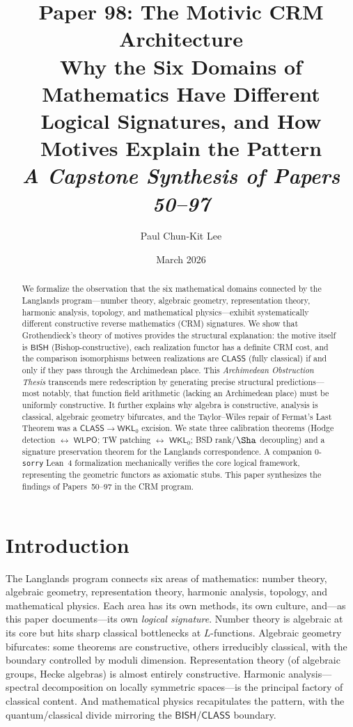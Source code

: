 \documentclass[11pt,a4paper]{article}
\title{\textbf{Paper 98: The Motivic CRM Architecture}\\[6pt]
\large Why the Six Domains of Mathematics Have Different\\
Logical Signatures, and How Motives Explain the Pattern\\[12pt]
\normalsize\textit{A Capstone Synthesis of Papers 50--97}}
\author{Paul Chun-Kit Lee}
\date{March 2026}
\theoremstyle{plain}
\theoremstyle{definition}
\newcommand{\BISH}{\textsf{BISH}}
\newcommand{\WKL}{\textsf{WKL}_0}
\newcommand{\WLPO}{\textsf{WLPO}}
\newcommand{\CLASS}{\textsf{CLASS}}
\begin{document}
\maketitle

\begin{abstract}
We formalize the observation that the six mathematical domains connected by the Langlands program---number theory, algebraic geometry, representation theory, harmonic analysis, topology, and mathematical physics---exhibit systematically different constructive reverse mathematics (CRM) signatures. We show that Grothendieck's theory of motives provides the structural explanation: the motive itself is $\BISH$ (Bishop-constructive), each realization functor has a definite CRM cost, and the comparison isomorphisms between realizations are $\CLASS$ (fully classical) if and only if they pass through the Archimedean place. This \emph{Archimedean Obstruction Thesis} transcends mere redescription by generating precise structural predictions---most notably, that function field arithmetic (lacking an Archimedean place) must be uniformly constructive. It further explains why algebra is constructive, analysis is classical, algebraic geometry bifurcates, and the Taylor--Wiles repair of Fermat's Last Theorem was a $\CLASS \to \WKL$ excision. We state three calibration theorems (Hodge detection $\leftrightarrow$ $\WLPO$; TW patching $\leftrightarrow$ $\WKL$; BSD rank/$\Sha$ decoupling) and a signature preservation theorem for the Langlands correspondence. A companion 0-\texttt{sorry} Lean~4 formalization mechanically verifies the core logical framework, representing the geometric functors as axiomatic stubs. This paper synthesizes the findings of Papers~50--97 in the CRM program.
\end{abstract}

\tableofcontents
\newpage

\section{Introduction}\label{sec:intro}

The Langlands program connects six areas of mathematics: number theory, algebraic geometry, representation theory, harmonic analysis, topology, and mathematical physics. Each area has its own methods, its own culture, and---as this paper documents---its own \emph{logical signature}. Number theory is algebraic at its core but hits sharp classical bottlenecks at $L$-functions. Algebraic geometry bifurcates: some theorems are constructive, others irreducibly classical, with the boundary controlled by moduli dimension. Representation theory (of algebraic groups, Hecke algebras) is almost entirely constructive. Harmonic analysis---spectral decomposition on locally symmetric spaces---is the principal factory of classical content. And mathematical physics recapitulates the pattern, with the quantum/classical divide mirroring the $\BISH$/$\CLASS$ boundary.
\end{document}
